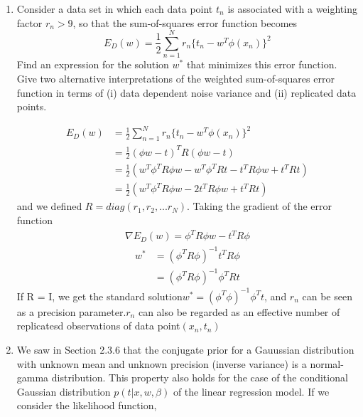 \documentclass[a4paper]{article}
\begin{document}
	\courseheader
	\begin{enumerate}
		\setlength{\itemsep}{3\parskip}
		\item
		Consider a data set in which each data point $t_n$ is associated with a weighting factor $r_n > 9$, so that the sum-of-squares error function becomes\\
		\begin{equation*}
		E_D(w)=\frac{1}{2}\sum_{n=1}^{N}r_n \{t_n-w^T \phi(x_n) \}^2
		\end{equation*}
		Find an expression for the solution $w^*$ that minimizes this error function. Give two alternative interpretations of the weighted sum-of-squares error function in terms of (i) data dependent noise variance and (ii) replicated data points.
		\begin{solution}
			\begin{equation*}
			\begin{aligned}
				E_D(w)
				&=\frac{1}{2}\sum_{n=1}^{N}r_n \{t_n-w^T \phi(x_n) \}^2 \\
				&=\frac{1}{2}(\phi w - t)^TR(\phi w - t)\\
				&=\frac{1}{2}(w^T\phi^T R \phi w - w^T\phi^T R t - t^T R\phi w + t^TRt)\\
				&=\frac{1}{2}(w^T\phi^T R \phi w - 2t^T R \phi w + t^TRt)
			\end{aligned}
			\end{equation*}
			and we defined $R=diag(r_1,r_2,...r_N).$
			Taking the gradient of the error function
			\begin{equation*}
			\begin{aligned}
				\nabla E_D(w)=\phi^TR\phi w - t^TR\phi
			\end{aligned}
			\end{equation*}
			\begin{equation*}
				\begin{aligned}
				w^*
				&= (\phi^T R \phi)^{-1}t^TR\phi\\
				&= (\phi^T R \phi)^{-1}\phi^TRt
				\end{aligned}
			\end{equation*}
			If R = I, we get the standard solution$w^* = (\phi^T\phi)^{-1}\phi^Tt$, and $r_n$ can be seen as a precision parameter.$r_n$ can also be regarded as an effective number of replicatesd observations of data point$(x_n,t_n)$
		\end{solution}
		\item
		We saw in Section 2.3.6 that the conjugate prior for a Gauussian distribution with unknown mean and unknown precision (inverse  variance) is a normal-gamma distribution. This property also holds for the case of the conditional Gaussian distribution $p(t|x,w,\beta)$ of the linear regression model. If we consider the likelihood function,

\end{enumerate}
\end{document}
